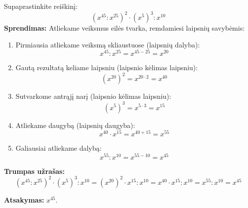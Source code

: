 \documentclass[11pt,a4paper]{scrartcl}
\begin{document}
\begin{example}
Supaprastinkite reiškinį:
$$ \left(x^{45} : x^{25}\right)^2 \cdot\left(x^{5}\right)^3 : x^{10} $$
\textbf{Sprendimas:}
Atliekame veiksmus eilės tvarka, remdamiesi laipsnių savybėmis:
\begin{enumerate}
    \item Pirmiausia atliekame veiksmą skliaustuose (laipsnių dalyba):
    $$ x^{45} : x^{25} = x^{45-25} = x^{20} $$
    
    \item Gautą rezultatą keliame laipsniu (laipsnio kėlimas laipsniu):
    $$ (x^{20})^2 = x^{20 \cdot 2} = x^{40} $$
    
    \item Sutvarkome antrąjį narį (laipsnio kėlimas laipsniu):
    $$ (x^5)^3 = x^{5 \cdot 3} = x^{15} $$
    
    \item Atliekame daugybą (laipsnių daugyba):
    $$ x^{40} \cdot x^{15} = x^{40+15} = x^{55} $$
    
    \item Galiausiai atliekame dalybą:
    $$ x^{55} : x^{10} = x^{55-10} = x^{45} $$
\end{enumerate}

\textbf{Trumpas užrašas:}
$$ \left(x^{45} : x^{25}\right)^2 \cdot\left(x^{5}\right)^3 : x^{10} = (x^{20})^2 \cdot x^{15} : x^{10} = x^{40} \cdot x^{15} : x^{10} = x^{55} : x^{10} = x^{45} $$

\textbf{Atsakymas:} $x^{45}$.
\end{example}
\end{document}
